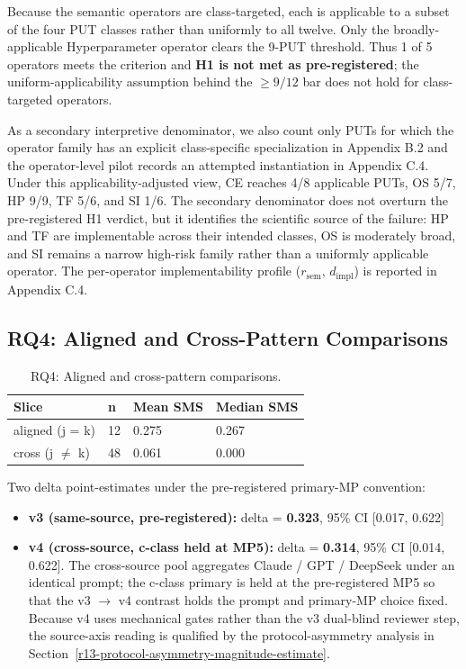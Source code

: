 \documentclass[12pt]{article}
\providecommand{\tightlist}{\setlength{\itemsep}{0pt}\setlength{\parskip}{0pt}}
\begin{document}
Because the semantic operators are class-targeted, each is applicable
to a subset of the four PUT classes rather than uniformly to all twelve.
Only the broadly-applicable Hyperparameter operator clears the 9-PUT
threshold. Thus 1 of 5 operators meets the criterion and \textbf{H1 is
not met as pre-registered}; the uniform-applicability assumption behind
the $\geq 9/12$ bar does not hold for class-targeted operators.

As a secondary interpretive denominator, we also count only PUTs for
which the operator family has an explicit class-specific specialization
in Appendix B.2 and the operator-level pilot records an attempted
instantiation in Appendix C.4. Under this applicability-adjusted view,
CE reaches 4/8 applicable PUTs, OS 5/7, HP 9/9, TF 5/6, and SI 1/6. The
secondary denominator does not overturn the pre-registered H1 verdict,
but it identifies the scientific source of the failure: HP and TF are
implementable across their intended classes, OS is moderately broad, and
SI remains a narrow high-risk family rather than a uniformly applicable
operator. The per-operator implementability profile ($r_{\mathrm{sem}}$,
$d_{\mathrm{impl}}$) is reported in Appendix C.4.

\subsection{RQ4: Aligned and Cross-Pattern Comparisons}\label{rq2-aligned-vs-cross-cliffs-delta}

{\def\LTcaptype{table} %
\begin{longtable}[]{@{}llll@{}}
\caption{RQ4: Aligned and cross-pattern comparisons.}\label{tab:p2-09}\\
\toprule\noalign{}
Slice & n & Mean SMS & Median SMS \\
\midrule\noalign{}
\endhead
\bottomrule\noalign{}
\endlastfoot
aligned (j = k) & 12 & 0.275 & 0.267 \\
cross (j $\neq$ k) & 48 & 0.061 & 0.000 \\
\end{longtable}
}

Two delta point-estimates under the pre-registered primary-MP
convention:

\begin{itemize}
\tightlist
\item
  \textbf{v3 (same-source, pre-registered):} delta = \textbf{0.323},
  95\% CI {[}0.017, 0.622{]}
\item
  \textbf{v4 (cross-source, c-class held at MP5):} delta =
  \textbf{0.314}, 95\% CI {[}0.014, 0.622{]}. The cross-source pool
  aggregates Claude / GPT / DeepSeek under an identical prompt; the
  c-class primary is held at the pre-registered MP5 so that the v3 $\to$ v4
  contrast holds the prompt and primary-MP choice fixed. Because v4 uses
  mechanical gates rather than the v3 dual-blind reviewer step, the
  source-axis reading is qualified by the protocol-asymmetry analysis in
  Section~\ref{r13-protocol-asymmetry-magnitude-estimate}.
\end{itemize}
\end{document}
